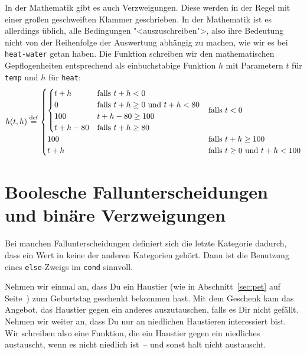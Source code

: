 In der Mathematik gibt es auch Verzweigungen.  Diese werden in der
Regel mit einer großen geschweiften Klammer geschrieben.  In der
Mathematik ist es allerdings üblich, alle Bedingungen
"<auszuschreiben">, also ihre Bedeutung nicht von der Reihenfolge der
Auswertung abhängig zu machen, wie wir es bei \lstinline{heat-water}
getan haben.  Die Funktion schreiben wir den mathematischen
Gepflogenheiten entsprechend als einbuchstabige Funktion $h$ mit
Parametern $t$ für \lstinline{temp} und $h$ für \lstinline{heat}:
%
\begin{displaymath}
  h(t, h) \stackrel{\rm def}{=}
  \begin{cases}
    \begin{cases}
      t + h & \text{falls } t + h < 0\\
      0 & \text{falls } t + h \geq 0 \text{ und } t + h < 80 \\
      100 & t + h - 80 \geq 100\\
      t + h - 80 & \text{falls }  t +h \geq
      80
    \end{cases}
    & \text{falls } t < 0
    \\
    100 & \text{falls } t + h \geq 100
    \\
    t + h & \text{falls } t \geq 0 \text{ und } t + h < 100
  \end{cases}
\end{displaymath}

\section{Boolesche Fallunterscheidungen und binäre Verzweigungen}
\label{sec:binaere-verzweigungen}

Bei manchen Fallunterscheidungen definiert sich die letzte Kategorie
dadurch, dass ein Wert in keine der anderen Kategorien gehört.  Dann
ist die Benutzung eines \lstinline{else}-Zweigs im \lstinline{cond}
sinnvoll.

Nehmen wir einmal an, dass Du ein Haustier (wie in
Abschnitt~\ref{sec:pet} auf Seite~\pageref{sec:pet}) zum Geburtstag
geschenkt bekommen hast. Mit dem Geschenk kam das Angebot, das
Haustier gegen ein anderes auszutauschen, falls es Dir nicht gefällt.
Nehmen wir weiter an, dass Du nur an niedlichen Haustieren
interessiert bist.  Wir schreiben also eine Funktion, die ein Haustier
gegen ein niedliches austauscht, wenn es nicht niedlich ist~-- und
sonst halt nicht austauscht.

